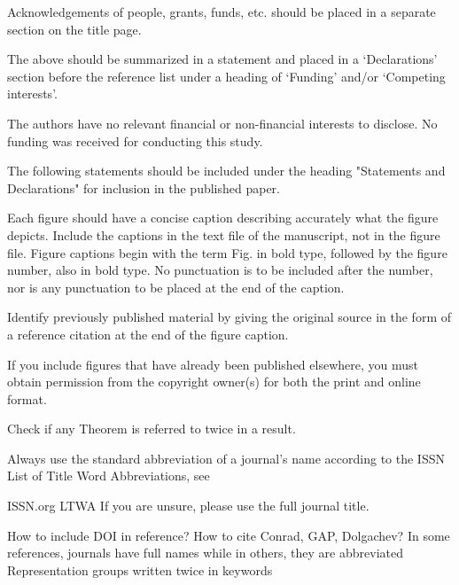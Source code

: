 \documentclass[a4paper,11pt]{amsart}
\numberwithin{equation}{section}
\numberwithin{equation}{subsection}
\newcommand{\Nayak}[1]{{\color{red} #1}}
\newcommand{\poonam}[1]{{\color{blue} #1}}
\begin{document}
\poonam{Acknowledgements of people, grants, funds, etc. should be placed in a separate section on the title page.}

\poonam{The above should be summarized in a statement and placed in a ‘Declarations’ section before the reference list under a heading of ‘Funding’ and/or ‘Competing interests’.}

\poonam{The authors have no relevant financial or non-financial interests to disclose. No funding was received for conducting this study. }

\poonam{The following statements should be included under the heading "Statements and Declarations" for inclusion in the published paper.}

\poonam{Each figure should have a concise caption describing accurately what the figure depicts. Include the captions in the text file of the manuscript, not in the figure file. Figure captions begin with the term Fig. in bold type, followed by the figure number, also in bold type. No punctuation is to be included after the number, nor is any punctuation to be placed at the end of the caption.}

\poonam{Identify previously published material by giving the original source in the form of a reference citation at the end of the figure caption.}

\poonam{If you include figures that have already been published elsewhere, you must obtain permission from the copyright owner(s) for both the print and online format.}

\poonam{Check if any Theorem is referred to twice in a result.}

\poonam{Always use the standard abbreviation of a journal’s name according to the ISSN List of Title Word Abbreviations, see

ISSN.org LTWA If you are unsure, please use the full journal title.}
\Nayak{How to include DOI in reference?}
\Nayak{How to cite Conrad, GAP, Dolgachev?}
\Nayak{In some references, journals have full names while in others, they are abbreviated}
\poonam{Representation groups written twice in keywords}

\fi
\end{document}
